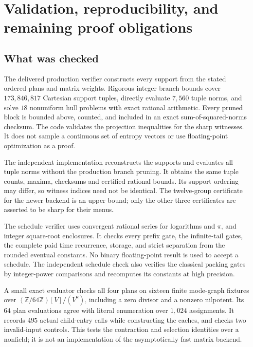 \section{Validation, reproducibility, and remaining proof obligations}
\label{sec:validation}

\subsection{What was checked}

The delivered production verifier constructs every support from the stated
ordered plans and matrix weights. Rigorous integer branch bounds cover
$173{,}846{,}817$ Cartesian support tuples, directly evaluate $7{,}560$
tuple norms, and solve $18$ nonuniform hull problems with exact rational
arithmetic. Every pruned block is bounded above, counted, and included in
an exact sum-of-squared-norms checksum. The code validates the projection
inequalities for the sharp witnesses. It does not sample a continuous set
of entropy vectors or use floating-point optimization as a proof.

The independent implementation reconstructs the supports and evaluates
all tuple norms without the production branch pruning. It obtains the
same tuple counts, maxima, checksums and certified rational bounds.
Its support ordering may differ, so witness indices need not be identical.
The twelve-group certificate for the newer backend is an upper bound;
only the other three certificates are asserted to be sharp for their menus.

The schedule verifier uses convergent rational series for logarithms and
$\pi$, and integer square-root enclosures. It checks every prefix gate,
the infinite-tail gates, the complete paid time recurrence, storage, and
strict separation from the rounded eventual constants. No binary
floating-point result is used to accept a schedule. The independent
schedule check also verifies the classical packing gates by integer-power
comparisons and recomputes its constants at high precision.

A small exact evaluator checks all four plans on sixteen finite mode-graph
fixtures over $(\mathbb Z/64\mathbb Z)[V]/(V^2)$, including a zero divisor
and a nonzero nilpotent. Its $64$ plan evaluations agree with literal
enumeration over $1{,}024$ assignments. It records $495$ actual child-entry
calls while constructing the caches, and checks two invalid-input controls.
This tests the contraction and selection identities over a nonfield; it is
not an implementation of the asymptotically fast matrix backend.

